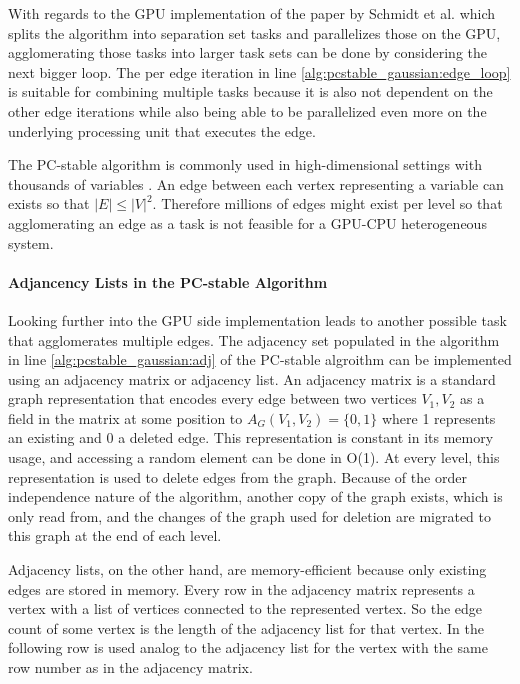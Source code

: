 With regards to the GPU implementation of the paper by Schmidt et al. \cite{schmidtOrderIndependentConstraintBasedCausal2018} which splits the algorithm into separation set tasks and parallelizes those on the GPU, agglomerating those tasks into larger task sets can be done by considering the next bigger loop. The per edge iteration in line \ref{alg:pcstable_gaussian:edge_loop} is suitable for combining multiple tasks because it is also not dependent on the other edge iterations while also being able to be parallelized even more on the underlying processing unit that executes the edge.

The PC-stable algorithm is commonly used in high-dimensional settings with thousands of variables \cite{nagarajanFunctionalRelationshipsGenes2010}. An edge between each vertex representing a variable can exists so that $|E| \leq |V|^{2}$. Therefore millions of edges might exist per level so that agglomerating an edge as a task is not feasible for a GPU-CPU heterogeneous system.

\paragraph{Adjancency Lists in the PC-stable Algorithm}
Looking further into the GPU side implementation leads to another possible task that agglomerates multiple edges. The adjacency set populated in the algorithm in line \ref{alg:pcstable_gaussian:adj} of the PC-stable algroithm can be implemented using an adjacency matrix or adjacency list. An adjacency matrix is a standard graph representation that encodes every edge between two vertices $V_1, V_2$ as a field in the matrix at some position to $A_G(V_1, V_2) = \{0,1\}$ where 1 represents an existing and 0 a deleted edge. This representation is constant in its memory usage, and accessing a random element can be done in O(1). At every level, this representation is used to delete edges from the graph. Because of the order independence nature of the algorithm, another copy of the graph exists, which is only read from, and the changes of the graph used for deletion are migrated to this graph at the end of each level.

Adjacency lists, on the other hand, are memory-efficient because only existing edges are stored in memory. Every row in the adjacency matrix represents a vertex with a list of vertices connected to the represented vertex. So the edge count of some vertex is the length of the adjacency list for that vertex. In the following row is used analog to the adjacency list for the vertex with the same row number as in the adjacency matrix.

